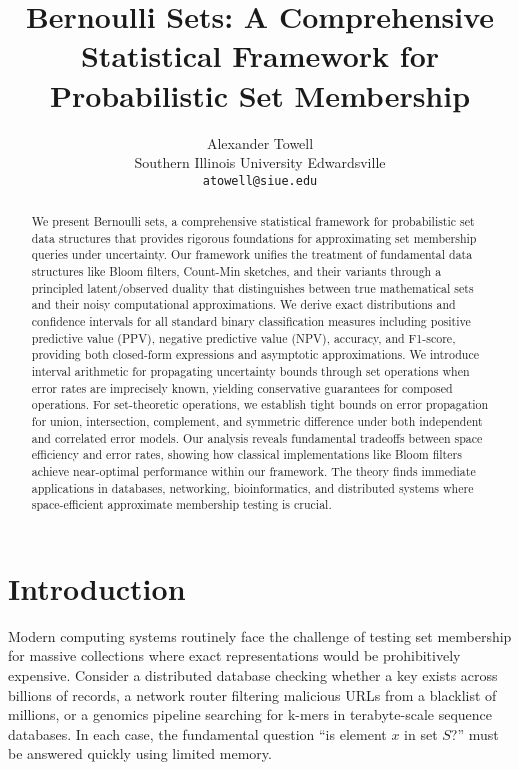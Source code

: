 \documentclass[11pt]{article}
\begin{document}
\title{Bernoulli Sets: A Comprehensive Statistical Framework for Probabilistic Set Membership}

\author{Alexander Towell\\
Southern Illinois University Edwardsville\\
\texttt{atowell@siue.edu}}

\date{}

\maketitle

\begin{abstract}
We present Bernoulli sets, a comprehensive statistical framework for probabilistic set data structures that provides rigorous foundations for approximating set membership queries under uncertainty. Our framework unifies the treatment of fundamental data structures like Bloom filters, Count-Min sketches, and their variants through a principled latent/observed duality that distinguishes between true mathematical sets and their noisy computational approximations. We derive exact distributions and confidence intervals for all standard binary classification measures including positive predictive value (PPV), negative predictive value (NPV), accuracy, and F1-score, providing both closed-form expressions and asymptotic approximations. We introduce interval arithmetic for propagating uncertainty bounds through set operations when error rates are imprecisely known, yielding conservative guarantees for composed operations. For set-theoretic operations, we establish tight bounds on error propagation for union, intersection, complement, and symmetric difference under both independent and correlated error models. Our analysis reveals fundamental tradeoffs between space efficiency and error rates, showing how classical implementations like Bloom filters achieve near-optimal performance within our framework. The theory finds immediate applications in databases, networking, bioinformatics, and distributed systems where space-efficient approximate membership testing is crucial.
\end{abstract}

\section{Introduction}

Modern computing systems routinely face the challenge of testing set membership for massive collections where exact representations would be prohibitively expensive. Consider a distributed database checking whether a key exists across billions of records, a network router filtering malicious URLs from a blacklist of millions, or a genomics pipeline searching for k-mers in terabyte-scale sequence databases. In each case, the fundamental question ``is element $x$ in set $S$?'' must be answered quickly using limited memory.
\end{document}
